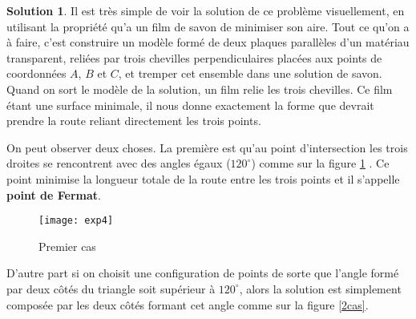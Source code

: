 \documentclass[10pt,a4paper]{article}%
\theoremstyle{theorem}
\theoremstyle{definition}
\newtheorem*{solution*}{Solution}
\begin{document}
		
		\begin{solution*}
			Il est très simple de voir la solution de ce problème visuellement, en utilisant la propriété qu'a un film de savon de minimiser son aire. Tout ce qu’on a à faire,	c’est construire un modèle formé de deux plaques parallèles d’un matériau transparent, reliées par trois chevilles perpendiculaires placées aux points de coordonnées $A$, $B$ et $C$, et tremper cet ensemble dans une solution de savon. Quand on sort le modèle de la solution, un film relie les trois chevilles. Ce film  étant une surface minimale, il nous donne exactement la forme que devrait prendre la route reliant directement les trois points. 	
			
			On peut observer deux choses. La première est qu’au point d’intersection les trois droites se rencontrent avec des angles égaux ($120^\circ$) comme sur la figure \ref{1cas} . Ce point minimise la longueur totale de la route entre les trois points et il s'appelle \textbf{point de Fermat}.
			
			\begin{figure}[h]
			\begin{minipage}[h]{0.49\linewidth}
				\begin{center}
				\end{center}
			\end{minipage}
			\hfill
			\begin{minipage}[h]{0.49\linewidth}
				\texttt{[image: exp4]}
			\end{minipage}
			\caption{Premier cas}\label{ris2.figure}\label{1cas}
			\end{figure}
			
			D’autre part si on choisit une configuration de points de sorte que l’angle formé par deux côtés du triangle soit supérieur à $120^\circ$, alors la solution est simplement composée par les deux côtés formant cet angle comme sur la figure \ref{2cas}.
			\begin{figure}[h]
				

\end{figure}
\end{solution*}
\end{document}
